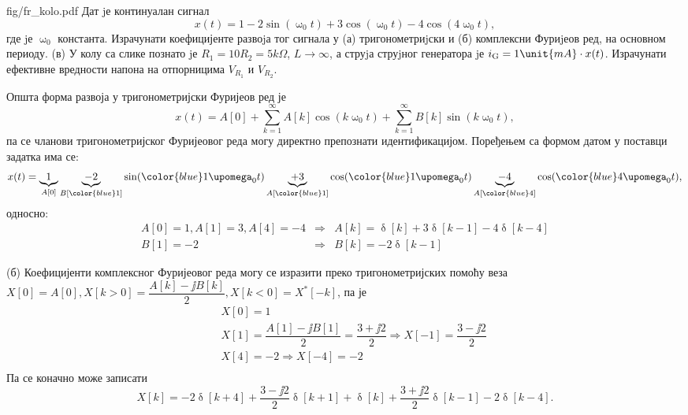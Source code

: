 \begin{slikaDesno}[0.833]{fig/fr_kolo.pdf}
    \PID
    Дат jе континуалан сигнал 
    $$ 
    x(t) = 1 - 2 \sin(\upomega_0 t) + 3 \cos(\upomega_0 t) 
    - 4 \cos(4 \upomega_0 t),$$ где jе $\upomega_0$ константа. 
    Израчунати коефицијенте развоjа тог сигнала у (а) тригонометриjски и (б) комплексни Фуриjеов ред, 
    на основном периоду. (в) У колу са слике познато jе $R_1 = 10R_2 = 5\unit{k\Omega}$, $L \to \infty$, 
    а струjа струjног генератора jе $i_{\rm G} = 1 \unit{mA} \cdot x(t)$. Израчунати ефективне вредности напона на отпорницима 
    $V_{R_1}$ и $V_{R_2}$.
\end{slikaDesno}

\RESENJE

Општа форма развоја у тригонометријски Фуријеов ред је 
\begin{equation}
    x(t) = A[0] + \sum_{k = 1}^{\infty} A[k] \cos(k\upomega_0 t) + \sum_{k = 1}^{\infty} B[k] \sin(k\upomega_0 t),
    \label{eq:trig_ctfs}
\end{equation}
па се чланови тригонометријског Фуријеовог реда могу директно препознати идентификацијом. Поређењем са формом датом у поставци задатка има се:
\begin{eqnarray}
    x(t) = 
    \underbrace{1}_{A[0]} 
    \underbrace{-2}_{B[{\color{blue}1}]} \sin({\color{blue} 1} \upomega_0 t) 
    \underbrace{+3}_{A[{\color{blue}1}]} \cos({\color{blue} 1} \upomega_0 t) 
    \underbrace{-4}_{A[{\color{blue}4}]} \cos({\color{blue} 4} \upomega_0 t),
\end{eqnarray}
односно: 
\begin{eqnarray}
    A[0] = 1, A[1] = 3, A[4] = -4 &\Rightarrow& A[k] = \updelta[k] + 3\updelta[k-1] - 4\updelta[k-4]\\
              B[1] = -2           &\Rightarrow& B[k] = -2\updelta[k-1]
\end{eqnarray}

(б) Коефицијенти комплексног Фуријеовог реда могу се изразити преко тригонометријских помоћу веза
$X[0] = A[0], X[k > 0] = \dfrac{A[k] - \jj B[k]}{2}, X[k < 0] = X^\ast[-k]$, па је 
\begin{eqnarray}
    && X[0] = 1 \\ 
    && X[1] = \dfrac{A[1] - \jj B[1]}{2} = \dfrac{3 + \jj 2}{2} \Rightarrow  X[-1] = \dfrac{3 - \jj 2}{2}  \\
    && X[4] = -2 \Rightarrow X[-4] = -2 \\
\end{eqnarray}
Па се коначно може записати 
\begin{equation}
    X[k] = - 2\updelta[k + 4] + \dfrac{3 - \jj 2}{2}\updelta[k+1] 
    + \updelta[k] 
    + \dfrac{3 + \jj 2}{2}\updelta[k-1] 
    - 2\updelta[k - 4].
\end{equation}

